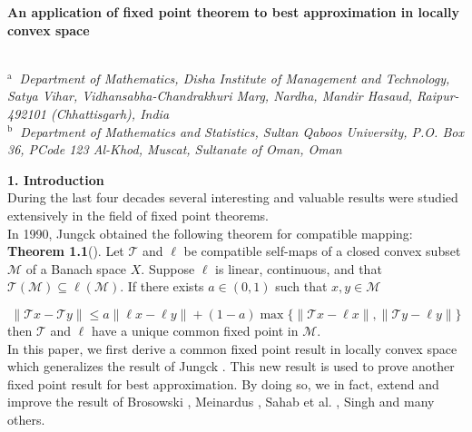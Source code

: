 \documentclass[12pt,a4paper,two side]{article}
\begin{document}
{\LARGE\textbf{An application of fixed point theorem to best approximation in locally convex space}}\\

\vspace{0.5cm}

\\

\hypertarget{phana}{${ }^{\text {a }}$ \fontsize{12pt}{12pt}\textit{Department of Mathematics, Disha Institute of Management and Technology, Satya Vihar, Vidhansabha-Chandrakhuri Marg, Nardha, Mandir Hasaud, Raipur-492101 (Chhattisgarh), India}}\\
\hypertarget{phanb}{${ }^{\text {b }}$} \fontsize{12pt}{12pt}\textit{Department of Mathematics and Statistics, Sultan Qaboos University, P.O. Box 36, PCode 123 Al-Khod, Muscat, Sultanate of Oman, Oman}\\

\vspace{0.7cm}

\textbf{ 1. Introduction}\\

During the last four decades several interesting and valuable results were studied extensively in the field of fixed point
 theorems.\\
 In 1990, Jungck \cite{1}  obtained the following theorem for compatible mapping:\\

 \hypertarget{muc1.1}{\textbf{ Theorem 1.1}}(\cite{citation-key1}). Let $\mathcal{T}$ and $\ell$ be compatible self-maps of a closed convex subset $\mathcal{M}$ of a Banach space $X$. Suppose $\ell$ is linear, continuous, and that $\mathcal{T}(\mathcal{M}) \subseteq \ell(\mathcal{M})$. If there exists $a \in(0,1)$ such that $x, y \in \mathcal{M}$

$$
\|\mathcal{T} x-\mathcal{T} y\| \leq a\|\ell x-\ell y\|+(1-a) \max \{\|\mathcal{T} x-\ell x\|,\|\mathcal{T} y-\ell y\|\}
$$
then $\mathcal{T}$ and $\ell$ have a unique common fixed point in $\mathcal{M}$.\\

In this paper, we first derive a common fixed point result in locally convex space which generalizes the result of Jungck \cite{citation-key1}. This new result is used to prove another fixed point result for best approximation. By doing so, we in fact, extend and improve the result of Brosowski \cite{citation-key2}, Meinardus \cite{citation-key3}, Sahab et al. \cite{citation-key4}, Singh \cite{citation-key5,citation-key6,citation-key7} and many others.\\
\end{document}
